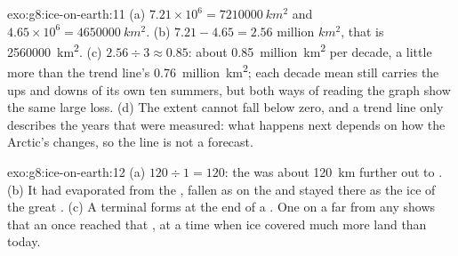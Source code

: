 \begin{solution}{exo:g8:ice-on-earth:11}
(a) $7.21 \times 10^6 = \qty{7210000}{km^2}$ and $4.65 \times 10^6 =
\qty{4650000}{km^2}$. (b) $7.21 - 4.65 = \num{2.56}\text{ million }\unit{km^2}$, that
is \qty{2560000}{km^2}. (c) $2.56 \div 3 \approx 0.85$: about
\num{0.85}~million~\unit{km^2} per decade, a little more than the trend line's
\num{0.76}~million~\unit{km^2}; each decade mean still carries the ups and downs
of its own ten summers, but both ways of reading the graph show the same
large loss. (d) The extent cannot fall below zero, and a trend line only
describes the years that were measured: what happens next depends on how
the Arctic's  changes, so the line is not a forecast.
\end{solution}

\begin{solution}{exo:g8:ice-on-earth:12}
(a) $120 \div 1 = 120$: the  was about \qty{120}{km} further out to
. (b) It had evaporated from the , fallen as  on the
 and stayed there as the ice of the great . (c) A
terminal  forms at the end of a . One on a  far from
any  shows that an  once reached that , at a time
when ice covered much more land than today.
\end{solution}

